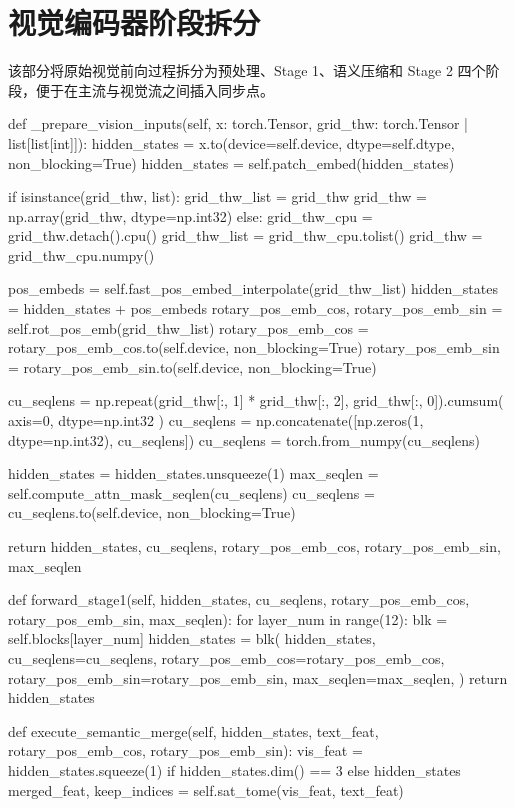 \section{视觉编码器阶段拆分}
该部分将原始视觉前向过程拆分为预处理、Stage 1、语义压缩和 Stage 2 四个阶段，便于在主流与视觉流之间插入同步点。
\begin{CodeBlock}
def _prepare_vision_inputs(self, x: torch.Tensor, grid_thw: torch.Tensor | list[list[int]]):
    hidden_states = x.to(device=self.device, dtype=self.dtype, non_blocking=True)
    hidden_states = self.patch_embed(hidden_states)

    if isinstance(grid_thw, list):
        grid_thw_list = grid_thw
        grid_thw = np.array(grid_thw, dtype=np.int32)
    else:
        grid_thw_cpu = grid_thw.detach().cpu()
        grid_thw_list = grid_thw_cpu.tolist()
        grid_thw = grid_thw_cpu.numpy()

    pos_embeds = self.fast_pos_embed_interpolate(grid_thw_list)
    hidden_states = hidden_states + pos_embeds
    rotary_pos_emb_cos, rotary_pos_emb_sin = self.rot_pos_emb(grid_thw_list)
    rotary_pos_emb_cos = rotary_pos_emb_cos.to(self.device, non_blocking=True)
    rotary_pos_emb_sin = rotary_pos_emb_sin.to(self.device, non_blocking=True)

    cu_seqlens = np.repeat(grid_thw[:, 1] * grid_thw[:, 2], grid_thw[:, 0]).cumsum(
        axis=0, dtype=np.int32
    )
    cu_seqlens = np.concatenate([np.zeros(1, dtype=np.int32), cu_seqlens])
    cu_seqlens = torch.from_numpy(cu_seqlens)

    hidden_states = hidden_states.unsqueeze(1)
    max_seqlen = self.compute_attn_mask_seqlen(cu_seqlens)
    cu_seqlens = cu_seqlens.to(self.device, non_blocking=True)

    return hidden_states, cu_seqlens, rotary_pos_emb_cos, rotary_pos_emb_sin, max_seqlen


def forward_stage1(self, hidden_states, cu_seqlens, rotary_pos_emb_cos, rotary_pos_emb_sin, max_seqlen):
    for layer_num in range(12):
        blk = self.blocks[layer_num]
        hidden_states = blk(
            hidden_states,
            cu_seqlens=cu_seqlens,
            rotary_pos_emb_cos=rotary_pos_emb_cos,
            rotary_pos_emb_sin=rotary_pos_emb_sin,
            max_seqlen=max_seqlen,
        )
    return hidden_states


def execute_semantic_merge(self, hidden_states, text_feat, rotary_pos_emb_cos, rotary_pos_emb_sin):
    vis_feat = hidden_states.squeeze(1) if hidden_states.dim() == 3 else hidden_states
    merged_feat, keep_indices = self.sat_tome(vis_feat, text_feat)


\end{CodeBlock}
